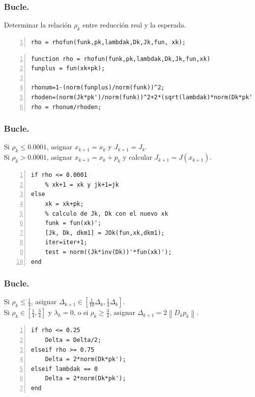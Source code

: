 \documentclass{beamer}
\newcommand{\norm}[1]{\left\lVert#1\right\rVert}
\begin{document}
\begin{frame}[fragile]
    \frametitle{Bucle.}
\begin{steps}[start=4]
    \item Determinar la relación $\rho_k$ entre reducción real y la esperada.
\end{steps}\pause
\vspace{0.3cm}
\begin{lstlisting}[frame=single, numbers=left, style=Matlab-editor]
rho = rhofun(funk,pk,lambdak,Dk,Jk,fun, xk);
\end{lstlisting}\pause
\begin{lstlisting}[frame=single, numbers=left, style=Matlab-editor]
function rho = rhofun(funk,pk,lambdak,Dk,Jk,fun,xk)
funplus = fun(xk+pk);

rhonum=1-(norm(funplus)/norm(funk))^2;
rhoden=(norm(Jk*pk')/norm(funk))^2+2*(sqrt(lambdak)*norm(Dk*pk')/norm(funk))^2;
rho = rhonum/rhoden;
\end{lstlisting}
\end{frame}

\begin{frame}[fragile]
    \frametitle{Bucle.}
\begin{steps}[start=5]
    \item Si $\rho_k \leq 0.0001$, asignar $x_{k+1} = x_k$ y $J_{k+1} = J_k$. \\
        Si $\rho_k > 0.0001$, asignar $x_{k+1} = x_k + p_k$ y calcular $J_{k+1} = J(x_{k+1})$.
\end{steps}\pause
\vspace{0.1cm}
\begin{lstlisting}[frame=single, numbers=left, style=Matlab-editor]
if rho <= 0.0001
    % xk+1 = xk y jk+1=jk
else
    xk = xk+pk;
    % calculo de Jk, Dk con el nuevo xk
    funk = fun(xk)';
    [Jk, Dk, dkm1] = JDk(fun,xk,dkm1);
    iter=iter+1;
    test = norm((Jk*inv(Dk))'*fun(xk)');
end
\end{lstlisting}
\end{frame}

\begin{frame}[fragile]
    \frametitle{Bucle.}
\begin{steps}[start=6]
    \item Si $\rho_k \leq \frac{1}{4}$, asignar $\Delta_{k+1} \in \left[
            \frac{1}{10}\Delta_k, \frac{1}{4}\Delta_k \right]$. \\
            Si $\rho_k \in \left[ \frac{1}{4}, \frac{3}{4} \right]$ y $\lambda_k = 0$,
            o si $\rho_k \geq \frac{3}{4}$,
            asignar $\Delta_{k+1} = 2\norm{D_kp_k}$.
\end{steps}\pause
\vspace{0.5cm}
\begin{lstlisting}[frame=single, numbers=left, style=Matlab-editor]
% actualizacion de Delta
if rho <= 0.25
    Delta = Delta/2;
elseif rho >= 0.75
    Delta = 2*norm(Dk*pk');
elseif lambdak == 0
    Delta = 2*norm(Dk*pk');
end
\end{lstlisting}
\end{frame}
\end{document}
